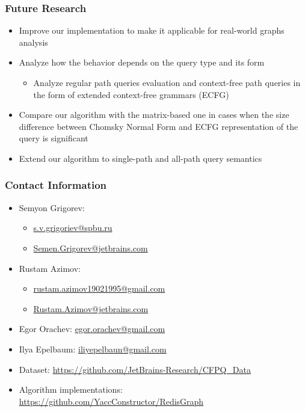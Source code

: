 \documentclass[xcolor=table]{beamer}
\begin{document}
\begin{frame}[fragile] \frametitle{Future Research}
  \begin{itemize}
  	\item Improve our implementation to make it applicable for real-world graphs analysis
  	\pause
  	\item Analyze how the behavior depends on the query type and its form
  	\begin{itemize}
  		\item Analyze regular path queries evaluation and context-free path queries in the form
  		of extended context-free grammars (ECFG)
  	\end{itemize}
  	\pause	
    \item Compare our algorithm with the matrix-based one
    in cases when the size difference between Chomsky Normal Form and ECFG
    representation of the query is significant
    \pause
    \item Extend our algorithm to single-path and all-path
    query semantics
\end{itemize}
\end{frame}

\begin{frame}
\frametitle{Contact Information}
\begin{itemize}
  \item Semyon Grigorev:
    \begin{itemize}
      \item \href{mailto:s.v.grigoriev@spbu.ru}{s.v.grigoriev@spbu.ru}
      \item \href{mailto:Semen.Grigorev@jetbrains.com}{Semen.Grigorev@jetbrains.com}
    \end{itemize}
  \item Rustam Azimov:
  \begin{itemize}
  	\item \href{mailto:rustam.azimov19021995@gmail.com}{rustam.azimov19021995@gmail.com}
  	\item \href{mailto:Rustam.Azimov@jetbrains.com}{Rustam.Azimov@jetbrains.com}
  \end{itemize}
  \item Egor Orachev: \href{mailto:egor.orachev@gmail.com}{egor.orachev@gmail.com}
  \item Ilya Epelbaum: \href{mailto:iliyepelbaun@gmail.com}{iliyepelbaun@gmail.com}
\vspace{0.5cm}
  \item Dataset: \href{https://github.com/JetBrains-Research/CFPQ_Data}{https://github.com/JetBrains-Research/CFPQ\_Data}
   \item Algorithm implementations: \href{https://github.com/YaccConstructor/RedisGraph}{https://github.com/YaccConstructor/RedisGraph}
\end{itemize}
\vspace{0.1cm}
\end{frame}
\end{document}
